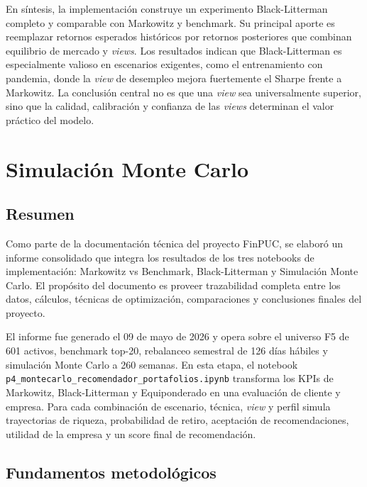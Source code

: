En s\'intesis, la implementaci\'on construye un experimento Black-Litterman
completo y comparable con Markowitz y benchmark. Su principal aporte es
reemplazar retornos esperados hist\'oricos por retornos posteriores que combinan
equilibrio de mercado y \textit{views}. Los resultados indican que
Black-Litterman es especialmente valioso en escenarios exigentes, como el
entrenamiento con pandemia, donde la \textit{view} de desempleo mejora
fuertemente el Sharpe frente a Markowitz. La conclusi\'on central no es que una
\textit{view} sea universalmente superior, sino que la calidad, calibraci\'on y
confianza de las \textit{views} determinan el valor pr\'actico del modelo.

\clearpage

\section*{Simulaci\'on Monte Carlo}

\subsection*{Resumen}

Como parte de la documentaci\'on t\'ecnica del proyecto FinPUC, se elabor\'o un
informe consolidado que integra los resultados de los tres notebooks de
implementaci\'on: Markowitz vs Benchmark, Black-Litterman y Simulaci\'on Monte
Carlo. El prop\'osito del documento es proveer trazabilidad completa entre los
datos, c\'alculos, t\'ecnicas de optimizaci\'on, comparaciones y conclusiones
finales del proyecto.

El informe fue generado el 09 de mayo de 2026 y opera sobre el universo F5 de
601 activos, benchmark top-20, rebalanceo semestral de 126 d\'ias h\'abiles y
simulaci\'on Monte Carlo a 260 semanas. En esta etapa, el notebook
\texttt{p4\_montecarlo\_recomendador\_portafolios.ipynb} transforma los KPIs de
Markowitz, Black-Litterman y Equiponderado en una evaluaci\'on de cliente y
empresa. Para cada combinaci\'on de escenario, t\'ecnica, \textit{view} y perfil
simula trayectorias de riqueza, probabilidad de retiro, aceptaci\'on de
recomendaciones, utilidad de la empresa y un score final de recomendaci\'on.

\subsection*{Fundamentos metodol\'ogicos}

